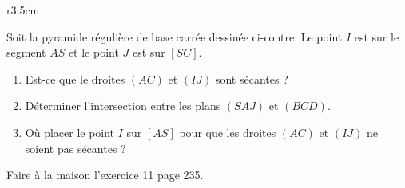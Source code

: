 
\begin{exercice}\label{exosmath-0081}

\begin{wrapfigure}{r}{3.5cm}
   \vspace{-0.3cm}        %
   \centering
   
\end{wrapfigure}

        Soit la pyramide régulière de base carrée dessinée ci-contre. Le point \( I\) est sur le segment \( AS\) et le point \( J\) est sur \( [SC]\).
        \begin{enumerate}
            \item
                Est-ce que le droites \( (AC)\) et \( (IJ)\) sont sécantes ?
            \item
                Déterminer l'intersection entre les plans \( (SAJ)\) et \( (BCD)\).
            \item
                Où placer le point \( I\) sur \( [AS]\) pour que les droites \( (AC)\) et \( (IJ)\) ne soient pas sécantes ?
        \end{enumerate}

        Faire à la maison l'exercice 11 page 235.

\end{exercice}
